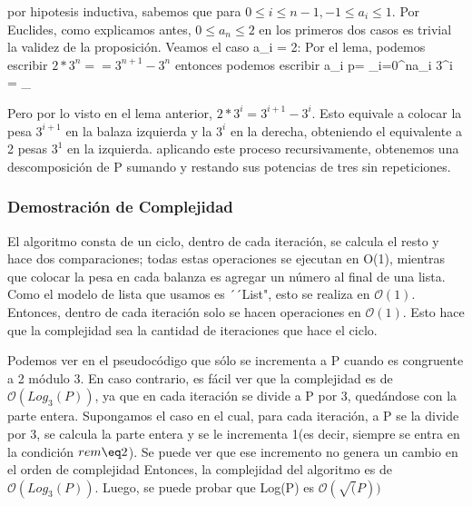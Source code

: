 \documentclass[spanish,12pt]{article}
\begin{document}
por hipotesis inductiva, sabemos que para $0\leq i \leq n-1, -1\leq a_{i}\leq 1$. Por Euclides, como explicamos antes, $0\leq a_{n} \leq 2 $ en los primeros dos casos es trivial la validez de la proposición.
Veamos el caso a_{i} = 2:
  Por el lema, podemos escribir $2*3^{n}= = 3^{n+1}-3^{n}$  entonces  podemos escribir a_{i} p= \sum_{i=0}^{n}{a_i 3^{i}} = \sum_{


 Pero por lo visto en el lema anterior, $2*3^{i}= 3^{i+1}-3^{i}$. Esto equivale a colocar la pesa $3^{i+1}$ en la balaza izquierda y la $3^{i}$ en la derecha, obteniendo el equivalente a 2 pesas $3^{1}$ en la izquierda. aplicando este proceso recursivamente, obtenemos  una descomposición de P sumando y restando sus potencias de tres sin repeticiones.


\subsubsection{Demostración de Complejidad}

El algoritmo consta de un ciclo, dentro de cada iteración, se calcula el resto y hace dos comparaciones; todas estas operaciones se ejecutan en O(1), mientras que colocar la pesa en cada balanza
es agregar un número al final de una lista. Como el modelo de lista que usamos es ´´List", esto se realiza en $\mathcal{O}(1)$.
Entonces, dentro de cada iteración solo se hacen operaciones en $\mathcal{O}(1)$. Esto hace que la complejidad sea la cantidad de iteraciones que hace el ciclo.


Podemos ver en el pseudocódigo que sólo se incrementa a P cuando es congruente a 2 módulo 3. En caso contrario, es fácil ver que la complejidad es de $\mathcal{O}(Log_{3}(P))$, ya que en cada iteración se divide a P por 3, quedándose con la parte entera.
Supongamos el caso en el cual, para cada iteración, a P se la divide por 3, se calcula la parte entera y se le incrementa 1(es decir, siempre se entra en la condición $rem \eq 2$). Se puede ver que ese incremento no genera un cambio en el orden de complejidad
Entonces, la complejidad del algoritmo es de $\mathcal{O}(Log_{3}(P))$.
Luego, se puede probar que Log(P) es $\mathcal{O}(\sqrt(P))$





}
\end{document}
